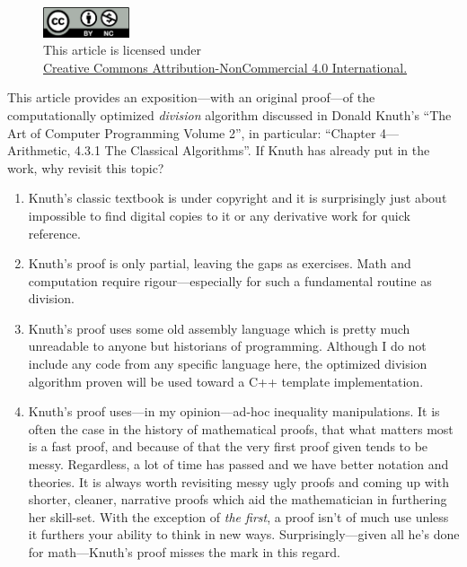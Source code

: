 \documentclass[twoside]{article}
\begin{document}
\begin{figure}[h]
\centering
\includegraphics[width=1in]{cc-by-nc.png}\\[0.1in]
\tiny This article is licensed under \\
\href{http://creativecommons.org/licenses/by-nc/4.0/}
{Creative Commons Attribution-NonCommercial 4.0 International.}\\[0.3in]
\end{figure}

This article provides an exposition---with an original proof---of the computationally optimized \emph{division}
algorithm discussed in Donald Knuth's ``The Art of Computer Programming Volume 2'', in particular: ``Chapter 4---Arithmetic,
4.3.1 The Classical Algorithms''.  If Knuth has already put in the work, why revisit this topic?

\begin{enumerate}
\item Knuth's classic textbook is under copyright and it is surprisingly just about impossible to find digital copies to
	it or any derivative work for quick reference.
\item Knuth's proof is only partial, leaving the gaps as exercises. Math and computation require rigour---especially
	for such a fundamental routine as division.
\item Knuth's proof uses some old assembly language which is pretty much unreadable to anyone but historians of programming.
	Although I do not include any code from any specific language here, the optimized division algorithm proven will be
	used toward a C++ template implementation.
\item Knuth's proof uses---in my opinion---ad-hoc inequality manipulations. It is often the case in the history of mathematical
	proofs, that what matters most is a fast proof, and because of that the very first proof given tends to be messy.
	Regardless, a lot of time has passed and we have better notation and theories. It is always worth revisiting messy
	ugly proofs and coming up with shorter, cleaner, narrative proofs which aid the mathematician in furthering her skill-set.
	With the exception of \emph{the first}, a proof isn't of much use unless it furthers your ability to think in new ways.
	Surprisingly---given all he's done for math---Knuth's proof misses the mark in this regard.
\end{enumerate}
\end{document}
